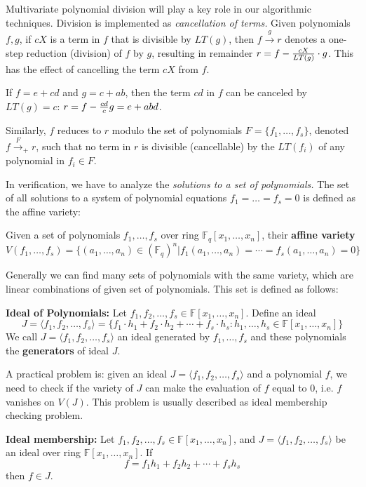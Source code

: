 Multivariate polynomial division will play a key role in our
algorithmic techniques. Division is implemented as {\it cancellation
  of terms.} Given polynomials $f, g$, if $cX$ is a term in
$f$ that is divisible by $LT(g)$, then $f \xrightarrow{g} r$ denotes a
one-step reduction (division) of $f$ by $g$, resulting in remainder $r
= f - {{cX} \over {LT(g)}} \cdot g$. This has the effect of cancelling
the term $cX$ from $f$. 
\begin{Example}
\label{ex:multidiv}
If $f = e + cd$ and $g = c + ab$,
then the term $cd$ in $f$ can be canceled by $LT(g) = c$: $r = f - {cd
  \over c} g = e + abd$. 
\end{Example}
  Similarly, $f$ reduces to $r$ modulo the set
of polynomials $F = \{f_1, \dots, f_s\}$, denoted $f \stackrel{F}
{\textstyle   \longrightarrow}_+ r$, such that no term in $r$ is
divisible (cancellable) by the $LT(f_i)$ of any polynomial in $ f_i
\in F$.    


In verification, we have to analyze the {\it solutions to a
set of polynomials.} The set of all solutions to a system of
polynomial equations $f_1 = \dots = f_s = 0$ is defined as the affine variety:
\begin{Definition}
Given a set of polynomials $f_1,\dots,f_s$ over ring $\mathbb F_q[x_1,\dots,x_n]$, their 
{\bf affine variety} 
$$V(f_1,\dots,f_s) = \{(a_1,\dots,a_n)\in  (\mathbb F_q)^n |
f_1(a_1,\dots,a_n) = \cdots = f_s(a_1,\dots,a_n) = 0\}$$ 
\end{Definition}

Generally we can find many sets of polynomials with the same variety, which are linear combinations
of given set of polynomials. This set is defined as follows:
\begin{Definition}
{\bf Ideal of Polynomials:} Let $f_1,f_2,\dots,f_s\in \mathbb F[x_1,\dots,x_n]$.
Define an ideal
$$J = \langle f_1,f_2,\dots,f_s\rangle = \{f_1\cdot h_1 + f_2\cdot h_2 +\cdots + f_s\cdot h_s : h_1,\dots,h_s\in \mathbb F[x_1,\dots,x_n]\}$$
We call $J = \langle f_1,f_2,\dots,f_s\rangle$ an ideal generated by $f_1,\dots,f_s$ and these polynomials 
the {\bf generators} of ideal $J$.
\end{Definition}
A practical problem is: given an ideal $J = \langle f_1,f_2,\dots,f_s\rangle$ and a polynomial $f$,
we need to check if the variety of $J$ can make the evaluation of $f$ equal to 0, i.e. $f$ vanishes on $V(J)$.
This problem is usually described as ideal membership checking problem.
\begin{Definition}
{\bf Ideal membership:} Let $f_1,f_2,\dots,f_s\in \mathbb F[x_1,\dots,x_n]$, and $J = \langle f_1,f_2,\dots,f_s\rangle$
be an ideal over ring $\mathbb F[x_1,\dots,x_n]$. If 
$$f = f_1h_1 + f_2h_2 + \cdots + f_sh_s$$
then $f\in J$.
\end{Definition}

